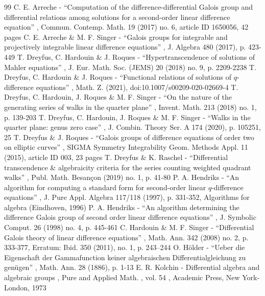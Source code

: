 \documentclass[11pt]{article}
\numberwithin{equation}{section}\providecommand{\loccit}{\textit{loc.\ cit.}}
\theoremstyle{definition}
\begin{document}

\begin{thebibliography}{99}
 C. E. Arreche - “Computation of the difference-differential Galois group and differential relations among solutions for a second-order linear difference equation” , Commun. Contemp. Math. 19 (2017) no. 6, article ID 1650056, 42 pages
 C. E. Arreche \& M. F. Singer - “Galois groups for integrable and projectively integrable linear difference equations” , J. Algebra 480 (2017), p. 423-449
 T. Dreyfus, C. Hardouin \& J. Roques - “Hypertranscendence of solutions of Mahler equations” , J. Eur. Math. Soc. (JEMS) 20 (2018) no. 9, p. 2209-2238
 T. Dreyfus, C. Hardouin \& J. Roques - “Functional relations of solutions of $ q $-difference equations” , Math. Z. (2021), doi:10.1007/s00209-020-02669-4
 T. Dreyfus, C. Hardouin, J. Roques \& M. F. Singer - “On the nature of the generating series of walks in the quarter plane” , Invent. Math. 213 (2018) no. 1, p. 139-203
 T. Dreyfus, C. Hardouin, J. Roques \& M. F. Singer - “Walks in the quarter plane: genus zero case” , J. Combin. Theory Ser. A 174 (2020), p. 105251, 25
 T. Dreyfus \& J. Roques - “Galois groups of difference equations of order two on elliptic curves” , SIGMA Symmetry Integrability Geom. Methods Appl. 11 (2015), article ID 003, 23 pages
 T. Dreyfus \& K. Raschel - “Differential transcendence \& algebraicity criteria for the series counting weighted quadrant walks” , Publ. Math. Besançon (2019) no. 1, p. 41-80
 P. A. Hendriks - “An algorithm for computing a standard form for second-order linear $q$-difference equations” , J. Pure Appl. Algebra 117/118 (1997), p. 331-352, Algorithms for algebra (Eindhoven, 1996)
 P. A. Hendriks - “An algorithm determining the difference Galois group of second order linear difference equations” , J. Symbolic Comput. 26 (1998) no. 4, p. 445-461
 C. Hardouin \& M. F. Singer - “Differential Galois theory of linear difference equations” , Math. Ann. 342 (2008) no. 2, p. 333-377, Erratum: Ibid. 350 (2011), no. 1, p. 243–244
 O. Hölder - “Ueber die Eigenschaft der Gammafunction keiner algebraischen Differentialgleichung zu genügen” , Math. Ann. 28 (1886), p. 1-13
 E. R. Kolchin - Differential algebra and algebraic groups , Pure and Applied Math. , vol. 54 , Academic Press, New York-London, 1973

\end{thebibliography}
\end{document}
